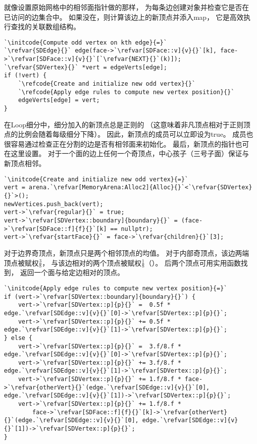 就像设置原始网格中的相邻面指针做的那样，
为每条边创建对象并检查它是否在已访问的边集合中。
如果没在，则计算该边上的新顶点并添入{\ttfamily map}，
它是高效执行查找的关联数组结构。
\begin{lstlisting}
`\initcode{Compute odd vertex on kth edge}{=}`
`\refvar{SDEdge}{}` edge(face->`\refvar[SDFace::v]{v}{}`[k], face->`\refvar[SDFace::v]{v}{}`[`\refvar{NEXT}{}`(k)]);
`\refvar{SDVertex}{}` *vert = edgeVerts[edge];
if (!vert) {
    `\refcode{Create and initialize new odd vertex}{}`
    `\refcode{Apply edge rules to compute new vertex position}{}`
    edgeVerts[edge] = vert;
}
\end{lstlisting}

在Loop细分中，细分加入的新顶点总是正则的
（这意味着非凡顶点相对于正则顶点的比例会随着每级细分下降）。
因此，新顶点的成员可以立即设为{\ttfamily true}。
成员也很容易通过检查正在分割的边是否有相邻面来初始化。
最后，新顶点的指针也可在这里设置。
对于一个面的边上任何一个奇顶点，中心孩子（三号子面）保证与新顶点相邻。
\begin{lstlisting}
`\initcode{Create and initialize new odd vertex}{=}`
vert = arena.`\refvar[MemoryArena:Alloc2]{Alloc}{}`<`\refvar{SDVertex}{}`>();
newVertices.push_back(vert);
vert->`\refvar{regular}{}` = true;
vert->`\refvar[SDVertex::boundary]{boundary}{}` = (face->`\refvar[SDFace::f]{f}{}`[k] == nullptr);
vert->`\refvar{startFace}{}` = face->`\refvar{children}{}`[3];
\end{lstlisting}

对于边界奇顶点，新顶点只是两个相邻顶点的均值。
对于内部奇顶点，该边两端顶点被赋权$\displaystyle\frac{3}{8}$，
与该边相对的两个顶点被赋权$\displaystyle\frac{1}{8}$（）。
后两个顶点可用实用函数找到，
返回一个面与给定边相对的顶点。
\begin{lstlisting}
`\initcode{Apply edge rules to compute new vertex position}{=}`
if (vert->`\refvar[SDVertex::boundary]{boundary}{}`) {
    vert->`\refvar[SDVertex::p]{p}{}` =  0.5f * edge.`\refvar[SDEdge::v]{v}{}`[0]->`\refvar[SDVertex::p]{p}{}`;
    vert->`\refvar[SDVertex::p]{p}{}` += 0.5f * edge.`\refvar[SDEdge::v]{v}{}`[1]->`\refvar[SDVertex::p]{p}{}`;
} else {
    vert->`\refvar[SDVertex::p]{p}{}` =  3.f/8.f * edge.`\refvar[SDEdge::v]{v}{}`[0]->`\refvar[SDVertex::p]{p}{}`;
    vert->`\refvar[SDVertex::p]{p}{}` += 3.f/8.f * edge.`\refvar[SDEdge::v]{v}{}`[1]->`\refvar[SDVertex::p]{p}{}`;
    vert->`\refvar[SDVertex::p]{p}{}` += 1.f/8.f * face->`\refvar{otherVert}{}`(edge.`\refvar[SDEdge::v]{v}{}`[0], edge.`\refvar[SDEdge::v]{v}{}`[1])->`\refvar[SDVertex::p]{p}{}`;
    vert->`\refvar[SDVertex::p]{p}{}` += 1.f/8.f *
        face->`\refvar[SDFace::f]{f}{}`[k]->`\refvar{otherVert}{}`(edge.`\refvar[SDEdge::v]{v}{}`[0], edge.`\refvar[SDEdge::v]{v}{}`[1])->`\refvar[SDVertex::p]{p}{}`;
}
\end{lstlisting}


